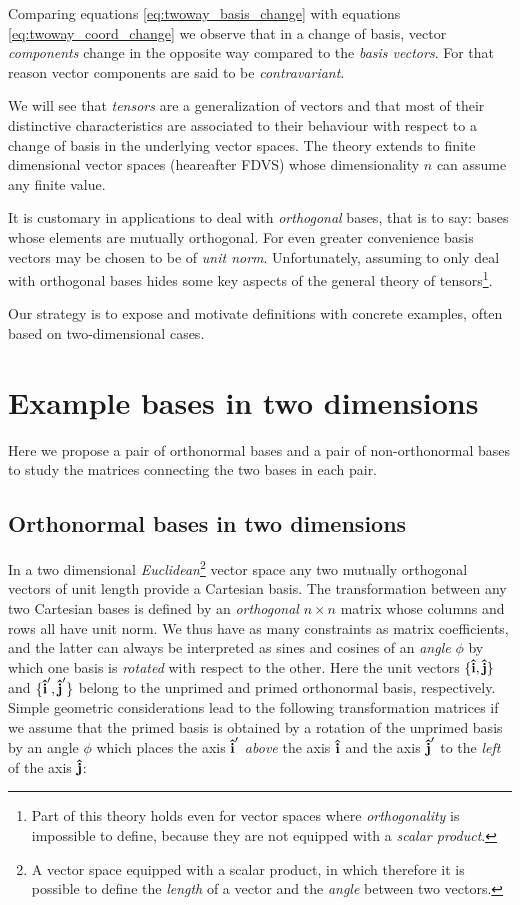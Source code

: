 Comparing equations \ref{eq:twoway_basis_change} with equations \ref{eq:twoway_coord_change} we observe that in a change of basis, vector \textit{components} change in the opposite way compared to the \textit{basis vectors}. For that reason vector components are said to be \textit{contravariant}.    

We will see that \textit{tensors} are a generalization of vectors and that most of their distinctive characteristics are associated to their behaviour with respect to a change of basis in the underlying vector spaces. The theory extends to finite dimensional vector spaces (heareafter FDVS) whose dimensionality $n$ can assume any finite value. 

It is customary in applications to deal with \textit{orthogonal} bases, that is to say: bases whose elements are mutually orthogonal. For even greater convenience basis vectors may be chosen to be of \textit{unit norm}. 
Unfortunately, assuming to only deal with orthogonal bases hides some key aspects of the general theory of tensors\footnote{Part of this theory holds even for vector spaces where \textit{orthogonality} is impossible to define, because they are not equipped with a \textit{scalar product}.}. 

Our strategy is to expose and motivate definitions with concrete examples, often based on two-dimensional cases.

\section{Example bases in two dimensions}
Here we propose a pair of orthonormal bases and a pair of non-orthonormal bases to study the matrices connecting the two bases in each pair.  

\subsection{Orthonormal bases in two dimensions}
In a two dimensional \textit{Euclidean}\footnote{A vector space equipped with a scalar product, in which therefore it is possible to define the \textit{length} of a vector and the \textit{angle} between two vectors.} vector space any two mutually orthogonal vectors of unit length provide a Cartesian basis. The transformation between any two Cartesian bases is defined by an \textit{orthogonal} $n \times n$ matrix whose columns and rows all have unit norm. We thus have as many constraints as matrix coefficients, and the latter can always be interpreted as sines and cosines of an  \textit{angle} $\phi$ by which one basis is \textit{rotated} with respect to the other. Here the unit vectors $\{\vu{i}, \vu{j}\}$ and $\{\vu{i}', \vu{j}'\}$ belong to the unprimed and primed orthonormal basis, respectively.  
Simple geometric considerations lead to the following transformation matrices if we assume that the primed basis is obtained by a rotation of the unprimed basis by an angle $\phi$ which places the axis $\vu{i}'$ \textit{above} the axis $\vu{i}$ and the axis $\vu{j}'$ to the \textit{left} of the axis $\vu{j}$: 


